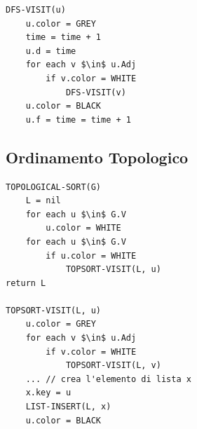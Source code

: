 \documentclass[10pt,a4paper]{article}
\begin{document}
\begin{multicols*}{2}
\begin{lstlisting}
DFS-VISIT(u)
    u.color = GREY
    time = time + 1
    u.d = time
    for each v $\in$ u.Adj
        if v.color = WHITE
            DFS-VISIT(v)
    u.color = BLACK
    u.f = time = time + 1
\end{lstlisting}
\subsection*{Ordinamento Topologico}
\begin{lstlisting}
TOPOLOGICAL-SORT(G)
    L = nil
    for each u $\in$ G.V
        u.color = WHITE
    for each u $\in$ G.V
        if u.color = WHITE
            TOPSORT-VISIT(L, u)
return L

TOPSORT-VISIT(L, u)
    u.color = GREY
    for each v $\in$ u.Adj
        if v.color = WHITE
            TOPSORT-VISIT(L, v)
    ... // crea l'elemento di lista x
    x.key = u
    LIST-INSERT(L, x)
    u.color = BLACK
\end{lstlisting}
\end{multicols*}
\end{document}
